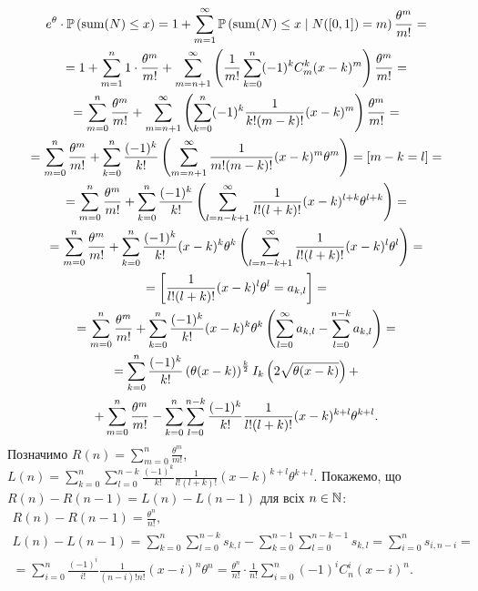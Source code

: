 \begin{gather*}
    e^{\theta} \cdot \mathbb{P}\left(\operatorname{sum}(N) \leq x\right) = 
    1 + \sum_{m=1}^{\infty} \mathbb{P}\left(\operatorname{sum}(N) \leq x \mid N([0, 1]) = m\right) \frac{\theta^m}{m!} = \\ =
    1 + \sum_{m=1}^{n} 1 \cdot \frac{\theta^m}{m!} + 
    \sum_{m=n+1}^{\infty} \left(
        \frac{1}{m!}\sum_{k=0}^{n} (-1)^k C_m^k (x-k)^m
    \right) \frac{\theta^m}{m!} = \\ =
    \sum_{m=0}^{n} \frac{\theta^m}{m!} + 
    \sum_{m=n+1}^{\infty} \left(
        \sum_{k=0}^{n} (-1)^k \frac{1}{k! (m-k)!} (x-k)^m
    \right) \frac{\theta^m}{m!} = \\ =
    \sum_{m=0}^{n} \frac{\theta^m}{m!} + 
    \sum_{k=0}^{n} \frac{(-1)^k}{k!} \left(
        \sum_{m=n+1}^{\infty} \frac{1}{m! (m-k)!} (x - k)^m \theta^m
    \right) = \left[m - k = l \right] = \\
    = \sum_{m=0}^{n} \frac{\theta^m}{m!} + 
    \sum_{k=0}^{n} \frac{(-1)^k}{k!} \left(
        \sum_{l=n-k+1}^{\infty} \frac{1}{l! (l+k)!} (x - k)^{l+k} \theta^{l+k}
    \right) = \\ =
    \sum_{m=0}^{n} \frac{\theta^m}{m!} + 
    \sum_{k=0}^{n} \frac{(-1)^k}{k!} (x-k)^k \theta^k
    \left(
        \sum_{l=n-k+1}^{\infty} \frac{1}{l! (l+k)!} (x - k)^{l} \theta^{l}
    \right) = \\ = \left[\frac{1}{l! (l+k)!} (x - k)^{l} \theta^{l} = a_{k, l}\right] = \\ =
    \sum_{m=0}^{n} \frac{\theta^m}{m!} +
    \sum_{k=0}^{n} \frac{(-1)^k}{k!} (x-k)^k \theta^k
    \left(
        \sum_{l=0}^{\infty} a_{k, l} - 
        \sum_{l=0}^{n-k} a_{k, l} 
    \right) = \\
    = \sum_{k=0}^{n} \frac{(-1)^k}{k!}
    \left(\theta (x - k)\right)^{\frac{k}{2}} I_k\left(2\sqrt{\theta(x-k)}\right) + \\ +
    \sum_{m=0}^{n} \frac{\theta^m}{m!}
    - \sum_{k=0}^{n} \sum_{l=0}^{n-k}  \frac{(-1)^k}{k!} \frac{1}{l! (l+k)!} (x - k)^{k+l} \theta^{k+l}.
\end{gather*} 
Позначимо $R(n) = \sum_{m=0}^{n} \frac{\theta^m}{m!}$,
$L(n) = \sum_{k=0}^{n} \sum_{l=0}^{n-k} \frac{(-1)^k}{k!} \frac{1}{l! (l+k)!} (x - k)^{k+l} \theta^{k+l}$.
Покажемо, що $R(n) - R(n-1) = L(n) - L(n-1)$ для всіх $n \in \mathbb{N}$:
\begin{gather*}
    R(n) - R(n-1) = \frac{\theta^n}{n!}, \\
    L(n) - L(n-1) = \sum_{k=0}^n \sum_{l=0}^{n-k} s_{k, l} - 
    \sum_{k=0}^{n-1} \sum_{l=0}^{n-k-1} s_{k, l} = \sum_{i=0}^n s_{i, n-i} = \\ =
    \sum_{i=0}^n \frac{(-1)^i}{i!} \frac{1}{(n-i)! n!} (x - i)^n \theta^n = 
    \frac{\theta^n}{n!} \cdot \frac{1}{n!} \sum_{i=0}^n (-1)^i C_n^i (x-i)^n.
\end{gather*}
